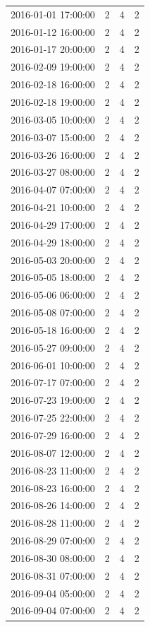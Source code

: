 \begin{tabular}{lrrr}
2016-01-01 17:00:00 & 2 & 4 & 2 \\
2016-01-12 16:00:00 & 2 & 4 & 2 \\
2016-01-17 20:00:00 & 2 & 4 & 2 \\
2016-02-09 19:00:00 & 2 & 4 & 2 \\
2016-02-18 16:00:00 & 2 & 4 & 2 \\
2016-02-18 19:00:00 & 2 & 4 & 2 \\
2016-03-05 10:00:00 & 2 & 4 & 2 \\
2016-03-07 15:00:00 & 2 & 4 & 2 \\
2016-03-26 16:00:00 & 2 & 4 & 2 \\
2016-03-27 08:00:00 & 2 & 4 & 2 \\
2016-04-07 07:00:00 & 2 & 4 & 2 \\
2016-04-21 10:00:00 & 2 & 4 & 2 \\
2016-04-29 17:00:00 & 2 & 4 & 2 \\
2016-04-29 18:00:00 & 2 & 4 & 2 \\
2016-05-03 20:00:00 & 2 & 4 & 2 \\
2016-05-05 18:00:00 & 2 & 4 & 2 \\
2016-05-06 06:00:00 & 2 & 4 & 2 \\
2016-05-08 07:00:00 & 2 & 4 & 2 \\
2016-05-18 16:00:00 & 2 & 4 & 2 \\
2016-05-27 09:00:00 & 2 & 4 & 2 \\
2016-06-01 10:00:00 & 2 & 4 & 2 \\
2016-07-17 07:00:00 & 2 & 4 & 2 \\
2016-07-23 19:00:00 & 2 & 4 & 2 \\
2016-07-25 22:00:00 & 2 & 4 & 2 \\
2016-07-29 16:00:00 & 2 & 4 & 2 \\
2016-08-07 12:00:00 & 2 & 4 & 2 \\
2016-08-23 11:00:00 & 2 & 4 & 2 \\
2016-08-23 16:00:00 & 2 & 4 & 2 \\
2016-08-26 14:00:00 & 2 & 4 & 2 \\
2016-08-28 11:00:00 & 2 & 4 & 2 \\
2016-08-29 07:00:00 & 2 & 4 & 2 \\
2016-08-30 08:00:00 & 2 & 4 & 2 \\
2016-08-31 07:00:00 & 2 & 4 & 2 \\
2016-09-04 05:00:00 & 2 & 4 & 2 \\
2016-09-04 07:00:00 & 2 & 4 & 2 \\

\end{tabular}
